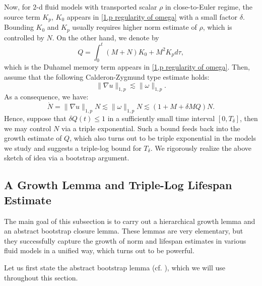 \documentclass[12pt,letterpaper]{article}
\theoremstyle{plain}
\begin{document}
Now, for $2$-d fluid models with transported scalar $\rho$ in close-to-Euler regime, the source term $K_p$, $K_0$ appears in \eqref{1,p regularity of omega} with a small factor $\delta$. Bounding $K_0$ and $K_p$ usually requires higher norm estimate of $\rho$, which is controlled by $N$. On the other hand, we denote by
\begin{equation*}
 Q=\int_0^t (M+N)K_0+M^2 K_p d\tau,   
\end{equation*}
which is the Duhamel memory term appears in \eqref{1,p regularity of omega}. Then, assume that the following Calderon-Zygmund type estimate holds:
\begin{equation*}
 \lVert\nabla u\rVert_{1,p}\lesssim \lVert\omega\rVert_{1,p}.   
\end{equation*}
As a consequence, we have:
\begin{equation*}
 \dot N=\lVert\nabla u\rVert_{1,p}N\lesssim \lVert  \omega\rVert_{1,p} N\lesssim (1+M+\delta MQ)N.
\end{equation*}
Hence, suppose that $\delta Q(t)\le 1$ in a sufficiently small time interval $[0, T_\delta]$, then we may control $N$ via a triple exponential. Such a bound feeds back into the growth estimate of $Q$, which also turns out to be triple exponential in the models we study and suggests a triple-log bound for $T_\delta$. We rigorously realize the above sketch of idea via a bootstrap argument. 

\subsection{A Growth Lemma and Triple-Log Lifespan Estimate}

The main goal of this subsection is to carry out a hierarchical growth lemma and an abstract bootstrap closure lemma. These lemmas are very elementary, but they successfully capture the growth of norm and lifespan estimates in various fluid models in a unified way, which turns out to be powerful.

Let us first state the abstract bootstrap lemma (cf. \cite{Tao2006NonlinearDispersive}), which we will use throughout this section.
\end{document}
